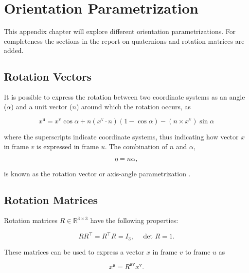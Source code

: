 \chapter{Orientation Parametrization} \label{chap:appen-orientparam}

This appendix chapter will explore different orientation parametrizations. For completeness the sections in the report on quaternions and rotation matrices are added.


\section{Rotation Vectors}
\label{sec:rotation_vector}
It is possible to express the rotation between two coordinate systems as an angle ($\alpha$) and a unit vector ($n$) around which the rotation occurs, as

\begin{equation}
	\label{eq:rot_vec_rela}
	x^{\mathrm{u}}=x^{\mathrm{v}} \cos \alpha+n\left(x^{\mathrm{v}} \cdot n\right)(1-\cos \alpha)-\left(n\times x^{\mathrm{v}}\right) \sin \alpha
\end{equation}

where the superscripts indicate coordinate systems, thus indicating how vector $x$ in frame $v$ is expressed in frame $u$. The combination of $n$ and $\alpha$, 

\begin{equation}
	\label{eq:rotation_vector}
	\eta = n \alpha,
\end{equation}

is known as the rotation vector or axis-angle parametrization \cite{Kok2017}.



\section{Rotation Matrices}
Rotation matrices $R \in \mathbb{R}^{3 \times 3}$ have the following properties:

\begin{equation}
	\label{eq:app_rot_mat_properties}
	R R^{\top}=R^{\top} R=I_{3}, \quad \text { det } R=1.
\end{equation}

These matrices can be used to express a vector $x$ in frame $v$ to frame $u$ as 

\begin{equation}
	\label{eq:app_rot_mat_rot_x}
	x^{\mathfrak{u}}=R^{\mathfrak{u} \mathrm{v}} x^{\mathrm{v}}.
\end{equation}

